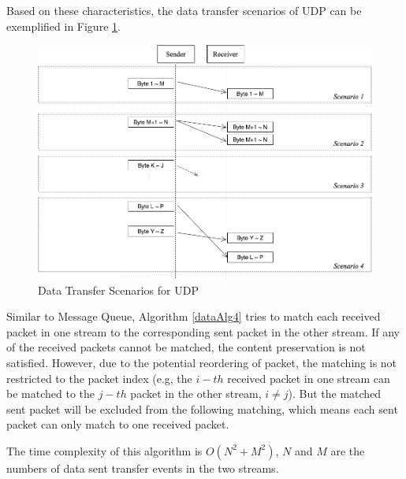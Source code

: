Based on these characteristics, the data transfer scenarios of UDP can be exemplified in Figure \ref{upd}.
\begin{figure}[H]
\centerline{\includegraphics[scale=0.4]{Figures/udp}}
 \caption{Data Transfer Scenarios for UDP}
\label{upd}
\end{figure}

Similar to Message Queue, Algorithm \ref{dataAlg4} tries to match each received packet in one stream to the corresponding sent packet in the other stream. If any of the received packets cannot be matched, the content preservation is not satisfied. However, due to the potential reordering of packet, the matching is not restricted to the packet index (e.g, the $i-th$ received packet in one stream can be matched to the $j-th$ packet in the other stream, $i \neq j$). But the matched sent packet will be excluded from the following matching, which means each sent packet can only match to one received packet.

The time complexity of this algorithm is $O(N^2+M^2)$, $N$ and $M$ are the numbers of data sent transfer events in the two streams.

